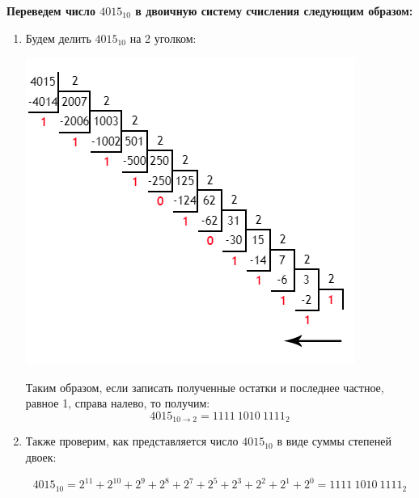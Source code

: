 \documentclass[12pt]{article}
\begin{document}
	\textbf{Переведем число $4015_{10}$ в двоичную систему счисления следующим образом:}
	\begin{enumerate}
		\item Будем делить $4015_{10}$ на 2 уголком: 
		
		\includegraphics[width=1\linewidth]{angle}
		
		Таким образом, если записать полученные остатки и последнее частное, равное 1, справа налево, то получим: $$4015_{10 \to 2} = 1111\:1010\:1111_2$$
		\item Также проверим, как представляется число $4015_{10}$ в виде суммы степеней двоек:
		
		$$4015_{10} = 2^{11} + 2^{10} + 2^9 + 2^8 + 2^7 + 2^5 + 2^3 + 2^2 + 2^1 + 2^0 = 1111\:1010\:1111_2$$
		
	\end{enumerate}
	
\end{document}
